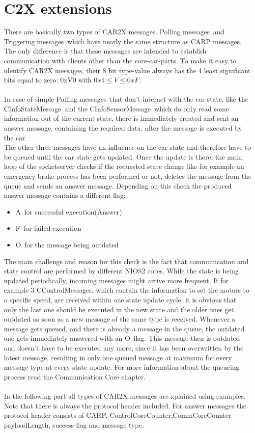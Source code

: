 \section{C2X extensions}
There are basically two types of CAR2X messages. \glqq Polling messages\grqq \ and \glqq Triggering messages\grqq \ which have nearly the same structure as CARP messages. The only difference is that these messages are intended to establish communication with clients other than the core-car-parts. To make it easy to identify CAR2X messages, their 8 bit type-value always has the 4 least significant bits equal to zero: 0xV0  with $0x1\leq V\leq 0xF$.\\ \\
In case of simple \glqq Polling messages\grqq \ that don’t interact with the car state, like the \glqq CInfoStateMessage\grqq \ and the \glqq CInfoSensorMessage\grqq \ which do only read some information out of the current state, there is immediately created and sent an answer message, containing the required data, after the message is executed by the car.\\
The other three messages have an influence on the car state and therefore have to be queued until the car state gets updated. Once the update is there, the main loop of the socketserver checks if the requested state change like for example an emergency brake process has been performed or not, deletes the message from the queue and sends an answer message. Depending on this check the produced answer message contains a different flag: 
\begin{itemize}
\item \glqq A\grqq \ for successful execution(\glqq Answer\grqq)
\item \glqq F\grqq \ for failed execution
\item \glqq O\grqq \ for the message being outdated
\end{itemize}
The main challenge and reason for this check is the fact that communication and state control are performed by different NIOS2 cores. While the state is being updated periodically, incoming messages might arrive more frequent. If for example 3 \glqq CControlMessages\grqq , which contain the information to set the motors to a specific speed, are received within one state update cycle, it is obvious that only the last one should be executed in the new state and the older ones get outdated as soon as a new message of the same type is received. Whenever a message gets queued, and there is already a message in the queue, the outdated one gets immediately answered with an \glqq O\grqq \ flag. This message then is outdated and doesn’t have to be executed any more, since it has been overwritten by the latest message, resulting in only one queued message at maximum for every message type at every state update. For more information about the queueing process read the Communication Core chapter.\\ \\
In the following part all types of CAR2X messages are xplained using examples. Note that there is always the protocol header included.
For answer messages the protocol header consists of CARP, \glqq ControlCoreCounter\grqq ,\glqq CommCoreCounter\grqq \, payloadLength, success-flag and message type.

